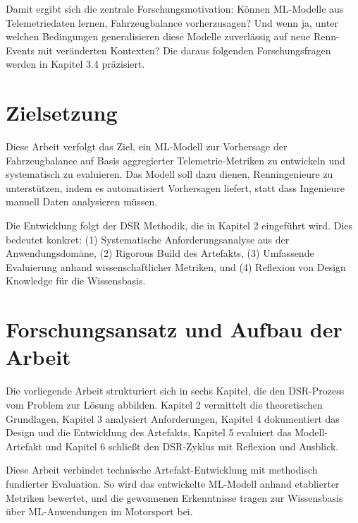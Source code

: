 Damit ergibt sich die zentrale Forschungsmotivation: Können \ac{ML}-Modelle aus Telemetriedaten lernen, Fahrzeugbalance vorherzusagen? Und wenn ja, unter welchen Bedingungen generalisieren diese Modelle zuverlässig auf neue Renn-Events mit veränderten Kontexten? Die daraus folgenden Forschungsfragen werden in Kapitel 3.4 präzisiert.

\section{Zielsetzung}

Diese Arbeit verfolgt das Ziel, ein \ac{ML}-Modell zur Vorhersage der Fahrzeugbalance auf Basis aggregierter Telemetrie-Metriken zu entwickeln und systematisch zu evaluieren. Das Modell soll dazu dienen, Renningenieure zu unterstützen, indem es automatisiert Vorhersagen liefert, statt dass Ingenieure manuell Daten analysieren müssen.

Die Entwicklung folgt der \ac{DSR} Methodik, die in Kapitel 2 eingeführt wird. Dies bedeutet konkret: (1) Systematische Anforderungsanalyse aus der Anwendungsdomäne, (2) Rigorous Build des Artefakts, (3) Umfassende Evaluierung anhand wissenschaftlicher Metriken, und (4) Reflexion von Design Knowledge für die Wissensbasis.

\section{Forschungsansatz und Aufbau der Arbeit}

Die vorliegende Arbeit strukturiert sich in sechs Kapitel, die den \ac{DSR}-Prozess vom Problem zur Lösung abbilden. Kapitel 2 vermittelt die theoretischen Grundlagen, Kapitel 3 analysiert Anforderungen, Kapitel 4 dokumentiert das Design und die Entwicklung des Artefakts, Kapitel 5 evaluiert das Modell-Artefakt und Kapitel 6 schließt den \ac{DSR}-Zyklus mit Reflexion und Ausblick.

Diese Arbeit verbindet technische Artefakt-Entwicklung mit methodisch fundierter 
Evaluation. So wird das entwickelte \ac{ML}-Modell anhand etablierter Metriken bewertet, 
und die gewonnenen Erkenntnisse tragen zur Wissensbasis über \ac{ML}-Anwendungen im 
Motorsport bei.